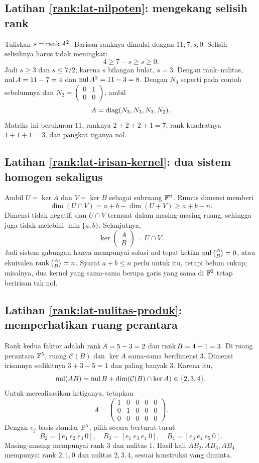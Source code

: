 \subsection*{Latihan \ref{rank:lat-nilpoten}: mengekang selisih rank}
Tuliskan $s=\operatorname{rank} A^2$. Barisan ranknya dimulai dengan $11,7,s,0$.
Selisih-selisihnya harus tidak meningkat:
\[
    4\ge7-s\ge s\ge0.
\]
Jadi $s\ge3$ dan $s\le7/2$; karena $s$ bilangan bulat, $s=3$.
Dengan rank--nulitas, $\operatorname{nul} A=11-7=4$ dan $\operatorname{nul} A^2=11-3=8$.
Dengan $N_3$ seperti pada contoh sebelumnya dan
$N_2=\begin{pmatrix}0&1\\0&0\end{pmatrix}$, ambil
\[
    A=\operatorname{diag}(N_3,N_3,N_3,N_2).
\]
Matriks ini berukuran $11$, ranknya $2+2+2+1=7$,
rank kuadratnya $1+1+1=3$, dan pangkat tiganya nol.

\subsection*{Latihan \ref{rank:lat-irisan-kernel}: dua sistem homogen sekaligus}
Ambil $U=\ker A$ dan $V=\ker B$ sebagai subruang $\mathbb{F}^n$.
Rumus dimensi memberi
\[
    \dim(U\cap V)=a+b-\dim(U+V)\ge a+b-n.
\]
Dimensi tidak negatif, dan $U\cap V$ termuat dalam masing-masing
ruang, sehingga juga tidak melebihi $\min\{a,b\}$.
Selanjutnya,
\[
    \ker\begin{pmatrix}A\\B\end{pmatrix}=U\cap V.
\]
Jadi sistem gabungan hanya mempunyai solusi nol tepat ketika
$\operatorname{nul}\binom{A}{B}=0$, atau ekuivalen $\operatorname{rank}\binom{A}{B}=n$.
Syarat $a+b\le n$ perlu untuk itu, tetapi belum cukup;
misalnya, dua kernel yang sama-sama berupa garis yang sama di $\mathbb{F}^2$
tetap beririsan tak nol.

\subsection*{Latihan \ref{rank:lat-nulitas-produk}: memperhatikan ruang perantara}
Rank kedua faktor adalah $\operatorname{rank} A=5-3=2$ dan $\operatorname{rank} B=4-1=3$.
Di ruang perantara $\mathbb{F}^5$, ruang $\mathcal C(B)$ dan $\ker A$
sama-sama berdimensi $3$. Dimensi irisannya sedikitnya $3+3-5=1$
dan paling banyak $3$. Karena itu,
\[
    \operatorname{nul}(AB)=\operatorname{nul} B+\dim(\mathcal C(B)\cap\ker A)\in\{2,3,4\}.
\]
Untuk merealisasikan ketiganya, tetapkan
\[
    A=\begin{pmatrix}1&0&0&0&0\\0&1&0&0&0\\0&0&0&0&0\end{pmatrix}.
\]
Dengan $e_j$ basis standar $\mathbb{F}^5$, pilih secara berturut-turut
\[
    B_2=[e_1\ e_2\ e_3\ 0],\quad
    B_3=[e_1\ e_3\ e_4\ 0],\quad
    B_4=[e_3\ e_4\ e_5\ 0].
\]
Masing-masing mempunyai rank $3$ dan nulitas $1$.
Hasil kali $AB_2,AB_3,AB_4$ mempunyai rank $2,1,0$ dan
nulitas $2,3,4$, sesuai konstruksi yang diminta.
\fi
